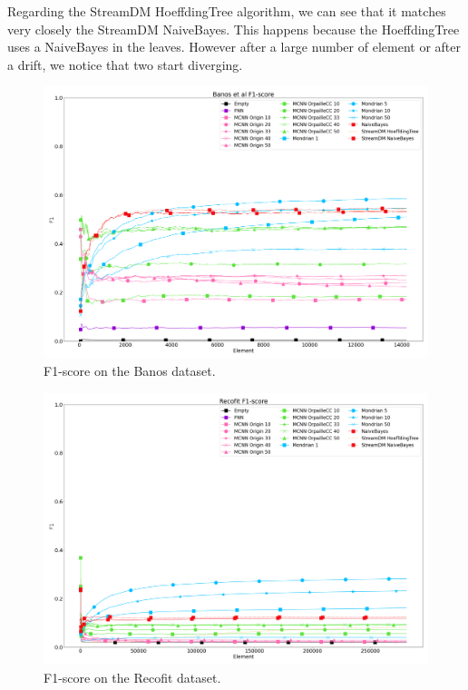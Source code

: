 Regarding the StreamDM HoeffdingTree algorithm, we can see that it matches very
closely the StreamDM NaiveBayes. This happens because the HoeffdingTree uses a
NaiveBayes in the leaves. However after a large number of element or after a
drift, we notice that two start diverging.

\begin{figure}[H]
	\includegraphics[width=\linewidth]{figures/results/banos_f1.png}
	\caption{F1-score on the Banos dataset.}
\end{figure}
\begin{figure}[H]
	\includegraphics[width=\linewidth]{figures/results/recofit_f1.png}
	\caption{F1-score on the Recofit dataset.}
\end{figure}
